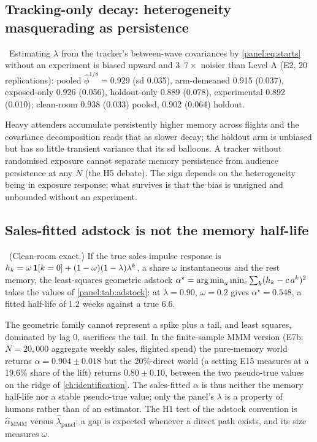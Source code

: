 \subsection{Tracking-only decay: heterogeneity masquerading as persistence}

\begin{proposition}
\label{panel:prop:tracking}
\tagNumerical\ Estimating $\lambda$ from the tracker's between-wave covariances by \cref{panel:eq:starts} without an experiment is biased upward and $3$--$7\times$ noisier than Level A (E2, 20 replications): pooled $\hat\phi^{1/8} = 0.929$ (sd 0.035), arm-demeaned 0.915 (0.037), exposed-only 0.926 (0.056), holdout-only 0.889 (0.078), experimental 0.892 (0.010); clean-room 0.938 (0.033) pooled, 0.902 (0.064) holdout.
\end{proposition}

Heavy attenders accumulate persistently higher memory across flights and the covariance decomposition reads that as slower decay; the holdout arm is unbiased but has so little transient variance that its sd balloons. A tracker without randomised exposure cannot separate memory persistence from audience persistence at any $N$ (the H5 debate). The sign depends on the heterogeneity being in exposure response; what survives is that the bias is unsigned and unbounded without an experiment.

\subsection{Sales-fitted adstock is not the memory half-life}

\begin{proposition}
\label{panel:prop:adstock}
\tagEstablished\ (Clean-room exact.) If the true sales impulse response is $h_k = \omega\,\mathbf{1}[k = 0] + (1 - \omega)(1 - \lambda)\lambda^{k}$, a share $\omega$ instantaneous and the rest memory, the least-squares geometric adstock $\alpha^\star = \operatorname*{arg\,min}_a \min_c \sum_k (h_k - c\,a^{k})^2$ takes the values of \cref{panel:tab:adstock}: at $\lambda = 0.90$, $\omega = 0.2$ gives $\alpha^\star = 0.548$, a fitted half-life of 1.2 weeks against a true 6.6.
\end{proposition}

The geometric family cannot represent a spike plus a tail, and least squares, dominated by lag 0, sacrifices the tail. In the finite-sample MMM version (E7b: $N = 20{,}000$ aggregate weekly sales, flighted spend) the pure-memory world returns $\alpha = 0.904 \pm 0.018$ but the 20\%-direct world (a setting E15 measures at a 19.6\% share of the lift) returns $0.80 \pm 0.10$, between the two pseudo-true values on the ridge of \cref{ch:identification}. The sales-fitted $\alpha$ is thus neither the memory half-life nor a stable pseudo-true value; only the panel's $\lambda$ is a property of humans rather than of an estimator. The H1 test of the adstock convention is $\hat\alpha_{\mathrm{MMM}}$ versus $\hat\lambda_{\mathrm{panel}}$: a gap is expected whenever a direct path exists, and its size measures $\omega$.


